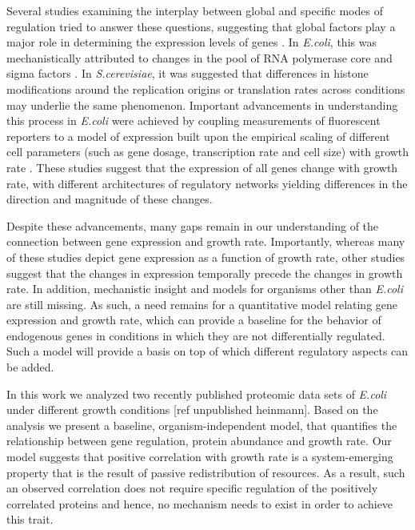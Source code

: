 \documentclass[notitlepage]{article}
\begin{document}
Several studies examining the interplay between global and specific modes of regulation tried to answer these questions, suggesting that global factors play a major role in determining the expression levels of genes \parencite{Gasch2000, Klumpp2009a,Scott2010}.
In \emph{E.coli}, this was mechanistically attributed to changes in the pool of RNA polymerase core and sigma factors \parencite{Klumpp2008}.
In \emph{S.cerevisiae}, it was suggested that differences in histone modifications around the replication origins \parencite{regenberg2006} or translation rates \parencite{Gasch2000} across conditions may underlie the same phenomenon.
Important advancements in understanding this process in \emph{E.coli} were achieved by coupling measurements of fluorescent reporters to a model of expression built upon the empirical scaling of different cell parameters (such as gene dosage, transcription rate and cell size) with growth rate \parencite{Klumpp2009a}.
These studies suggest that the expression of all genes change with growth rate, with different architectures of regulatory networks yielding differences in the direction and magnitude of these changes. 

Despite these advancements, many gaps remain in our understanding of the connection between gene expression and growth rate.
Importantly, whereas many of these studies depict gene expression as a function of growth rate, other studies suggest that the changes in expression temporally precede the changes in growth rate\parencite{levy2007}.
In addition, mechanistic insight and models for organisms other than \emph{E.coli} are still missing.
As such, a need remains for a quantitative model relating gene expression and growth rate, which can provide a baseline for the behavior of endogenous genes in conditions in which they are not differentially regulated.
Such a model will provide a basis on top of which different regulatory aspects can be added.

In this work we analyzed two recently published proteomic data sets of \emph{E.coli} under different growth conditions \parencite{Valgepea2013} [ref unpublished heinmann].
Based on the analysis we present a baseline, organism-independent model, that quantifies the relationship between gene regulation, protein abundance and growth rate.
Our model suggests that positive correlation with growth rate is a system-emerging property that is the result of passive redistribution of resources.
As a result, such an observed correlation does not require specific regulation of the positively correlated proteins and hence, no mechanism needs to exist in order to achieve this trait.
\end{document}
